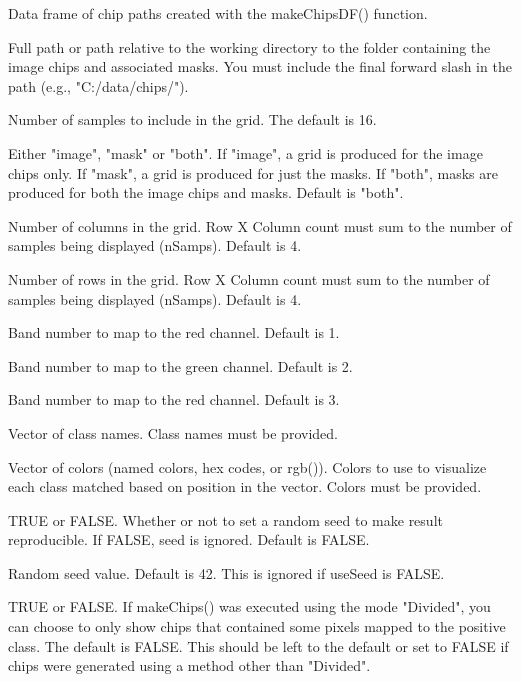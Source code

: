 \documentclass[a4paper]{book}
\begin{document}
\begin{Arguments}
\begin{ldescription}
\item[\code{chpDF}] Data frame of chip paths created with the makeChipsDF() function.

\item[\code{folder}] Full path or path relative to the working directory to the
folder containing the image chips and associated masks. You must include the
final forward slash in the path (e.g., "C:/data/chips/").

\item[\code{nSamps}] Number of samples to include in the grid. The default is 16.

\item[\code{mode}] Either "image", "mask" or "both". If "image", a grid is produced
for the image chips only. If "mask", a grid is produced for just the masks.
If "both", masks are produced for both the image chips and masks. Default is
"both".

\item[\code{cCnt}] Number of columns in the grid. Row X Column count must sum to the number
of samples being displayed (nSamps). Default is 4.

\item[\code{rCnt}] Number of rows in the grid. Row X Column count must sum to the number
of samples being displayed (nSamps). Default is 4.

\item[\code{r}] Band number to map to the red channel. Default is 1.

\item[\code{g}] Band number to map to the green channel. Default is 2.

\item[\code{b}] Band number to map to the red channel. Default is 3.

\item[\code{cNames}] Vector of class names. Class names must be provided.

\item[\code{cColors}] Vector of colors (named colors, hex codes, or rgb()).
Colors to use to visualize each class matched based on position
in the vector. Colors must be provided.

\item[\code{useSeed}] TRUE or FALSE. Whether or not to set a random seed to make result
reproducible. If FALSE, seed is ignored. Default is FALSE.

\item[\code{seed}] Random seed value. Default is 42. This is ignored if useSeed is FALSE.

\item[\code{justPostitive}] TRUE or FALSE. If makeChips() was executed using the mode "Divided", you can
choose to only show chips that contained some pixels mapped to the positive class.
The default is FALSE. This should be left to the default or set to FALSE if chips
were generated using a method other than "Divided".
\end{ldescription}
\end{Arguments}
\end{document}
